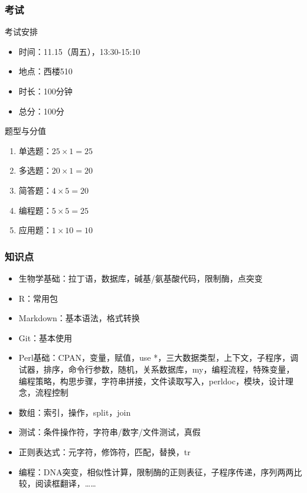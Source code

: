 \begin{frame}[plain]
\end{frame}

\begin{frame}
  \frametitle{考试}
  \begin{block}{考试安排}
    \begin{itemize}
      \item 时间：11.15（周五），13:30-15:10
      \item 地点：西楼510
      \item 时长：100分钟
      \item 总分：100分
    \end{itemize}
  \end{block}
  \pause
  \begin{block}{题型与分值}
    \begin{enumerate}
      \item 单选题：$25 \times 1  = 25$
      \item 多选题：$20 \times 1  = 20$
      \item 简答题：$4  \times 5  = 20$
      \item 编程题：$5  \times 5  = 25$
      \item 应用题：$1  \times 10 = 10$
    \end{enumerate}
  \end{block}
\end{frame}

\begin{frame}
  \frametitle{知识点}
  \begin{itemize}
    \item 生物学基础：拉丁语，数据库，碱基/氨基酸代码，限制酶，点突变
    \item R：常用包
    \item Markdown：基本语法，格式转换
    \item Git：基本使用
    \item Perl基础：CPAN，变量，赋值，use *，三大数据类型，上下文，子程序，调试器，排序，命令行参数，随机，关系数据库，my，编程流程，特殊变量，编程策略，构思步骤，字符串拼接，文件读取写入，perldoc，模块，设计理念，流程控制
    \item 数组：索引，操作，split，join
    \item 测试：条件操作符，字符串/数字/文件测试，真假
    \item 正则表达式：元字符，修饰符，匹配，替换，tr
    \item 编程：DNA突变，相似性计算，限制酶的正则表征，子程序传递，序列两两比较，阅读框翻译，……
  \end{itemize}
\end{frame}

